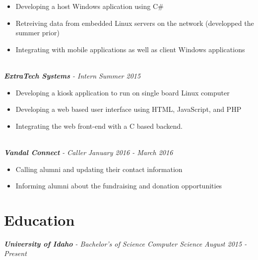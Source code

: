\documentclass[10pt]{article}
\begin{document}
    \begin{adjustwidth}{5mm}{}
      \begin{itemize}[noitemsep,nolistsep]
        \item Developing a host Windows aplication using C\#
        \item Retreiving data from embedded Linux servers on the network (developped the summer prior)
        \item Integrating with mobile applications as well as client Windows applications
     \end{itemize}
    \end{adjustwidth}
  \vspace{2mm}
  \noindent
  \\ \textit{\textbf{ExtraTech Systems} - Intern} \hfill \textit{Summer 2015}
    \begin{adjustwidth}{5mm}{}
      \begin{itemize}[noitemsep,nolistsep]
        \item Developing a kiosk application to run on single board Linux computer
        \item Developing a web based user interface using HTML, JavaScript, and PHP
        \item Integrating the web front-end with a C based backend.
  	  \end{itemize}
    \end{adjustwidth}
  \vspace{2mm}
  \noindent
  \\ \textit{\textbf{Vandal Connect} - Caller} \hfill \textit{January 2016 - March 2016}
    \begin{adjustwidth}{5mm}{}
      \begin{itemize}[noitemsep,nolistsep]
        \item Calling alumni and updating their contact information
        \item Informing alumni about the fundraising and donation opportunities
  	  \end{itemize}
    \end{adjustwidth}
\vspace{4mm}
\section*{Education}
  \vspace{2mm}
  \textit{\textbf{University of Idaho} - Bachelor's of Science Computer Science} \hfill \textit{August 2015 - Present}
\end{document}
